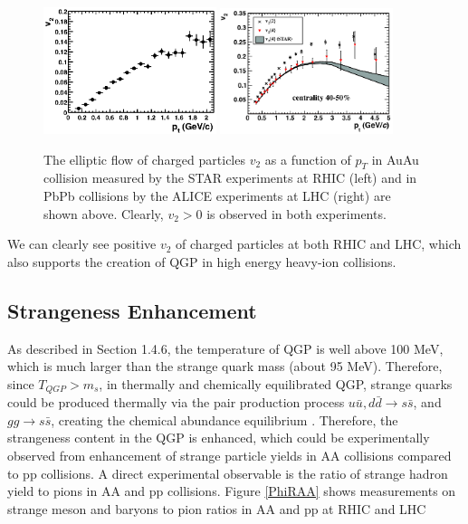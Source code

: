 \begin{figure}[hbtp]
\begin{center}
\includegraphics[width=0.45\textwidth]{Figures/Chapter1/STARV2Plot.eps}
\includegraphics[width=0.45\textwidth]{Figures/Chapter1/ALICEV2Plot.png}
\caption{The elliptic flow of charged particles $v_2$ as a function of $p_T$ in AuAu collision measured by the STAR experiments at RHIC (left) and in PbPb collisions by the ALICE experiments at LHC (right) are shown above. Clearly, $v_2 > 0$ is observed in both experiments.}
\label{V2}
\end{center}
\end{figure}   

We can clearly see positive $v_2$ of charged particles at both RHIC and LHC, which also supports the creation of QGP in high energy heavy-ion collisions.  
 
\subsection{Strangeness Enhancement} 

As described in Section 1.4.6, the temperature of QGP is well above 100 MeV, which is much larger than the strange quark mass (about 95 MeV). Therefore, since $T_{QGP} > m_s$, in thermally and chemically equilibrated QGP, strange quarks could be produced thermally via the pair production process $u \bar u, d \bar d \rightarrow s\bar s$, and $gg \rightarrow s \bar s$, creating the chemical abundance equilibrium \cite{SSEnhance}. Therefore, the strangeness content in the QGP is enhanced, which could be experimentally observed from enhancement of strange particle yields in AA collisions compared to pp collisions. A direct experimental observable is the ratio of strange hadron yield to pions in AA and pp collisions. Figure \ref{PhiRAA} shows measurements on strange meson and baryons to pion ratios in AA and pp at RHIC and LHC 

